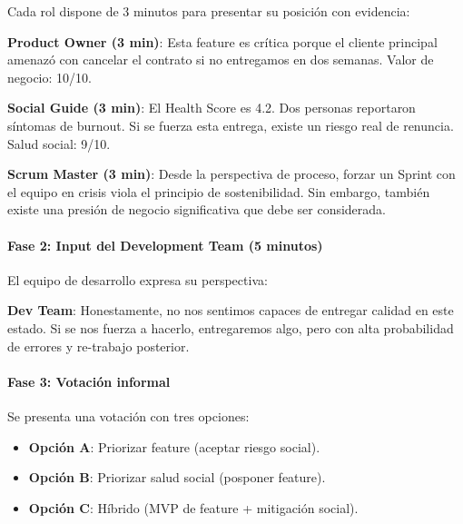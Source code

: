 Cada rol dispone de 3 minutos para presentar su posición con evidencia:

\begin{escenario}

    \textbf{Product Owner (3 min)}: Esta feature es crítica porque el cliente
    principal amenazó con cancelar el contrato si no entregamos en dos semanas.
    Valor de negocio: 10/10.

    \textbf{Social Guide (3 min)}: El Health Score es 4.2. Dos personas
    reportaron síntomas de burnout. Si se fuerza esta entrega,
    existe un riesgo real de renuncia. Salud social: 9/10.

    \textbf{Scrum Master (3 min)}: Desde la perspectiva de proceso,
    forzar un Sprint con el equipo en crisis viola el principio de
    sostenibilidad. Sin embargo, también existe una presión de negocio
    significativa que debe ser considerada.

\end{escenario}


\paragraph{Fase 2: Input del Development Team (5 minutos)}

El equipo de desarrollo expresa su perspectiva:

\begin{escenario}

    \textbf{Dev Team}: Honestamente, no nos sentimos capaces de
    entregar calidad en este estado. Si se nos fuerza a hacerlo,
    entregaremos algo, pero con alta probabilidad de errores y
    re-trabajo posterior.

\end{escenario}


\paragraph{Fase 3: Votación informal}

Se presenta una votación con tres opciones:

\begin{itemize}
    \item \textbf{Opción A}: Priorizar feature (aceptar riesgo social).
    \item \textbf{Opción B}: Priorizar salud social (posponer feature).
    \item \textbf{Opción C}: Híbrido (MVP de feature + mitigación social).
\end{itemize}


